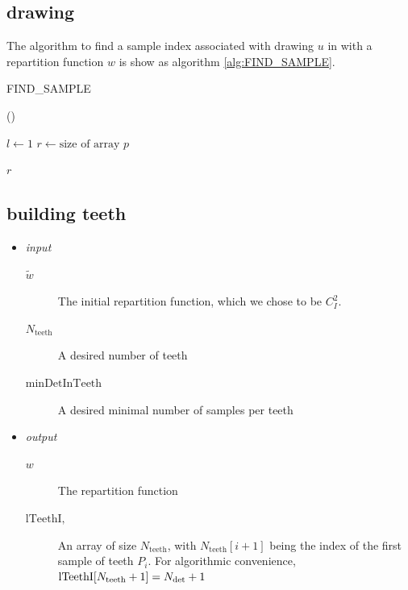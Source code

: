 \documentclass[./thesis.tex]{subfiles}
\newcommand{\minDetInTeeth}{\text{minDetInTeeth}}
\newcommand{\Nteeth}{N_\text{teeth}}
\newcommand{\lTeethI}{\text{lTeethI}}
\begin{document}
\subsection{drawing}

The algorithm to find a sample index associated with drawing $u$ in with a repartition function $w$ is show as algorithm \ref{alg:FIND_SAMPLE}.

\begin{algorithm}
\label{alg:FIND_SAMPLE}
\caption{FIND\_SAMPLE}
	
	\Fn(){}{
		$l \gets 1$ \;
		$r \gets \text{size of array } p$ \;
		
		\KwRet $r$ \;
	}
\end{algorithm}




\subsection{building teeth}

\begin{itemize}

\item
\emph{input}
\begin{description}
\item[$\tilde w$]
The initial repartition function, which we chose to be $C_I^2$.
\item[$\Nteeth$]
A desired number of teeth
\item[$\minDetInTeeth$]
A desired minimal number of samples per teeth
\end{description}

\item
\emph{output}
\begin{description}
\item[$w$]
The repartition function
\item[$\lTeethI, $]
An array of size $\Nteeth$, with $\Nteeth[i+1]$ being the index of the first sample of teeth $P_i$. For algorithmic convenience, $\lTeethI[\Nteeth+1] = \Ndet+1$  
\end{description}
\end{itemize}
\end{document}
